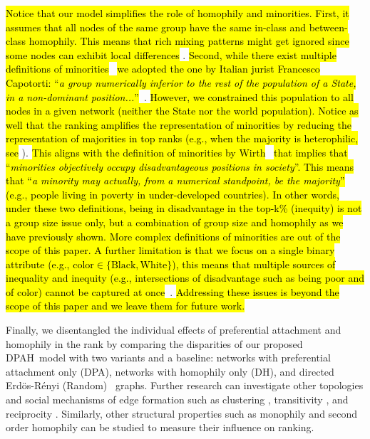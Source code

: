 \documentclass[fleqn,10pt]{wlscirep}
\begin{document}
\hl{Notice that our model simplifies the role of homophily and minorities. First, it assumes that all nodes of the same group have the same in-class and between-class homophily. This means that rich mixing patterns might get ignored since some nodes can exhibit local differences} \cite{peel2018multiscale}.
\hl{Second, while there exist multiple definitions of minorities}~\cite{smith1987some} \hl{we adopted the one by Italian jurist Francesco Capotorti: ``\textit{a group numerically inferior to the rest of the population of a State, in a non-dominant position...}''}~\cite{capotorti1979study, hannum2007concept}. \hl{However, we constrained this population to all nodes in a given network (neither the State nor the world population). 
Notice as well that the ranking amplifies the representation of minorities by reducing the representation of majorities in top ranks (e.g., when the majority is heterophilic, see} ). \hl{This aligns with the definition of minorities by Wirth}~\cite{wirth1945problem} \hl{that implies that ``\textit{minorities objectively occupy disadvantageous positions in society}''. This means that ``\textit{a minority may actually, from a numerical standpoint, be the majority}'' (e.g., people living in poverty in under-developed countries). 
In other words, under these two definitions, being in disadvantage in the top-k\% (inequity) is not a group size issue only, but a combination of group size and homophily as we have previously shown.
%
More complex definitions of minorities are out of the scope of this paper.
A further limitation is that we focus on a single binary attribute (e.g., $\text{color}\in \{\text{Black}, \text{White}\}$), this means that multiple sources of inequality and inequity (e.g., intersections of disadvantage such as being poor and of color) cannot be captured at once}~\cite{hurtado2018intersectional}. \hl{Addressing these issues is beyond the scope of this paper and we leave them for future work.}

Finally, we disentangled the individual effects of preferential attachment and homophily in the rank by comparing the disparities of our proposed {DPAH}~model with two variants and a baseline: networks with preferential attachment only (DPA), networks with homophily only (DH), and directed Erd\"{o}s-R\'{e}nyi (Random)~\cite{erdos1959random} graphs.
Further research can investigate other topologies and social mechanisms of edge formation %
such as clustering \cite{davis1970clustering}, transitivity \cite{block2015reciprocity}, and reciprocity \cite{dufwenberg2017reciprocity}. Similarly, other structural properties such as monophily \cite{altenburger2018monophily} and second order homophily \cite{Evtushenko2021paradox} can be studied to measure their influence on ranking.
\end{document}
